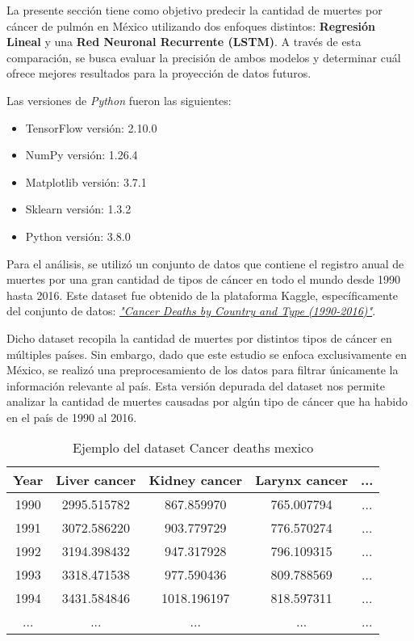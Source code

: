 La presente sección tiene como objetivo predecir la cantidad de muertes por cáncer de pulmón en México utilizando dos enfoques distintos: \textbf{Regresión Lineal} y una \textbf{Red Neuronal Recurrente (LSTM)}. A través de esta comparación, se busca evaluar la precisión de ambos modelos y determinar cuál ofrece mejores resultados para la proyección de datos futuros.

Las versiones de \textit{Python} fueron las siguientes:

\begin{itemize}
    \item TensorFlow versión: 2.10.0
    \item NumPy versión: 1.26.4
    \item Matplotlib versión: 3.7.1
    \item Sklearn versión: 1.3.2
    \item Python versión: 3.8.0
\end{itemize}

Para el análisis, se utilizó un conjunto de datos que contiene el registro anual de muertes por una gran cantidad de tipos de cáncer en todo el mundo desde 1990 hasta 2016. Este dataset fue obtenido de la plataforma Kaggle, específicamente del conjunto de datos:
\href{https://www.kaggle.com/datasets/antimoni/cancer-deaths-by-country-and-type-1990-2016}{\textit{"Cancer Deaths by Country and Type (1990-2016)"}}.


Dicho dataset recopila la cantidad de muertes por distintos tipos de cáncer en múltiples países. Sin embargo, dado que este estudio se enfoca exclusivamente en México, se realizó una preprocesamiento de los datos para filtrar únicamente la información relevante al país. Esta versión depurada del dataset nos permite analizar la cantidad de muertes causadas por algún tipo de cáncer que ha habido en el país de 1990 al 2016. 


\begin{table}[h!]
    \centering
    \begin{tabular}{|c|c|c|c|c|}
    \hline
    \textbf{Year} & \textbf{Liver cancer} & \textbf{Kidney cancer} & \textbf{Larynx cancer} & \textbf{...}\\ \hline
    1990 & 2995.515782 & 867.859970 & 765.007794 & ...\\ \hline
    1991 & 3072.586220 & 903.779729 & 776.570274 & ...\\ \hline
    1992 & 3194.398432 & 947.317928 & 796.109315 & ...\\ \hline
    1993 & 3318.471538 & 977.590436 & 809.788569 & ...\\ \hline
    1994 & 3431.584846 & 1018.196197 & 818.597311 & ...\\ \hline
    ... & ... & ... & ... & ...\\ \hline
    \end{tabular}
    \caption{Ejemplo del dataset Cancer deaths mexico}
    \label{table:cancer_cases}
\end{table}



